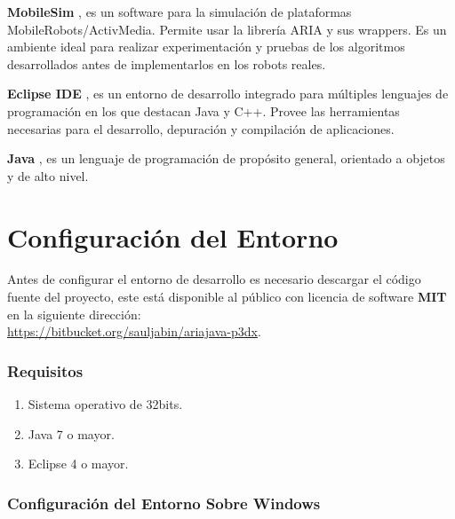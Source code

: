 \documentclass[11pt,twoside,A5]{article}
\newcommand{\link}[1]{{\footnotesize\url{#1}}}
\begin{document}
\textbf{MobileSim} \cite{mobilesim2014}, es un software para la simulación de plataformas
MobileRobots/ActivMedia. Permite usar la librería ARIA y sus wrappers. Es un ambiente
ideal para realizar experimentación y pruebas de los algoritmos desarrollados antes de
implementarlos en los robots reales.
 
\textbf{Eclipse IDE} \cite{eclipse2014}, es un entorno de desarrollo integrado para múltiples lenguajes de 
programación en los que destacan Java y C++. Provee las herramientas necesarias para el desarrollo, depuración  
y compilación de aplicaciones.

\textbf{Java} \cite{java2014}, es un lenguaje de programación de propósito general, orientado a objetos y de alto nivel. 
 
\section*{Configuración del Entorno}

Antes de configurar el entorno de desarrollo es necesario descargar el código fuente del proyecto,
este está disponible al público con licencia de software \textbf{MIT} en la siguiente dirección:
\\ \link{https://bitbucket.org/sauljabin/ariajava-p3dx}.

\subsubsection*{Requisitos}
\begin{enumerate}
\item Sistema operativo de 32bits.
\item Java 7 o mayor.
\item Eclipse 4 o mayor.
\end{enumerate}

\subsubsection*{Configuración del Entorno Sobre Windows}
\end{document}
